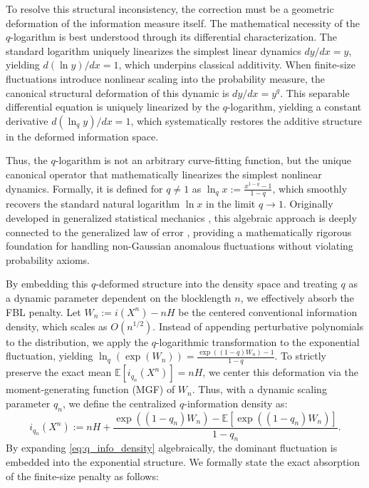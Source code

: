 \documentclass[conference]{IEEEtran}
\begin{document}
To resolve this structural inconsistency, the correction must be a geometric deformation of the information measure itself. The mathematical necessity of the $q$-logarithm is best understood through its differential characterization. The standard logarithm uniquely linearizes the simplest linear dynamics $dy/dx = y$, yielding $d(\ln y)/dx = 1$, which underpins classical additivity. When finite-size fluctuations introduce nonlinear scaling into the probability measure, the canonical structural deformation of this dynamic is $dy/dx = y^q$. This separable differential equation is uniquely linearized by the $q$-logarithm, yielding a constant derivative $d(\ln_q y)/dx = 1$, which systematically restores the additive structure in the deformed information space. 

Thus, the $q$-logarithm is not an arbitrary curve-fitting function, but the unique canonical operator that mathematically linearizes the simplest nonlinear dynamics. Formally, it is defined for $q \neq 1$ as $\ln_q x := \frac{x^{1-q}-1}{1-q}$, which smoothly recovers the standard natural logarithm $\ln x$ in the limit $q \to 1$. Originally developed in generalized statistical mechanics \cite{Tsallis2009}, this algebraic approach is deeply connected to the generalized law of error \cite{Suyari2005}, providing a mathematically rigorous foundation for handling non-Gaussian anomalous fluctuations without violating probability axioms.

By embedding this $q$-deformed structure into the density space and treating $q$ as a dynamic parameter dependent on the blocklength $n$, we effectively absorb the FBL penalty. Let $W_n := i(X^n) - nH$ be the centered conventional information density, which scales as $O(n^{1/2})$. Instead of appending perturbative polynomials to the distribution, we apply the $q$-logarithmic transformation to the exponential fluctuation, yielding $\ln_q(\exp(W_n)) = \frac{\exp((1-q)W_n)-1}{1-q}$. To strictly preserve the exact mean $\mathbb{E}[i_{q_n}(X^n)] = nH$, we center this deformation via the moment-generating function (MGF) of $W_n$. Thus, with a dynamic scaling parameter $q_n$, we define the centralized $q$-information density as:
\begin{equation}
    i_{q_n}(X^n) := nH + \frac{\exp((1-q_n)W_n) - \mathbb{E}[\exp((1-q_n)W_n)]}{1-q_n}.
    \label{eq:q_info_density}
\end{equation}
By expanding \eqref{eq:q_info_density} algebraically, the dominant fluctuation is embedded into the exponential structure. We formally state the exact absorption of the finite-size penalty as follows:
\end{document}
